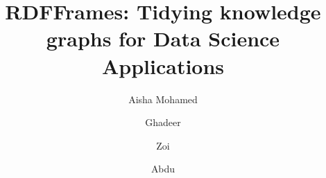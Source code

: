 \documentclass[sigconf, review, anonymous]{acmart}
\begin{document}
	

\title{RDFFrames: Tidying knowledge graphs for Data Science Applications}

\author{Aisha Mohamed}
\email{}
\orcid{}
\author{}
\affiliation{%
  \institution{}
  \streetaddress{}
  \city{}
  \state{}
  \postcode{}
}

\author{Ghadeer}
\email{}
\orcid{}
\author{}
\affiliation{%
  \institution{}
  \streetaddress{}
  \city{}
  \state{}
  \postcode{}
}

\author{Zoi}
\email{}
\orcid{}
\author{}
\affiliation{%
  \institution{}
  \streetaddress{}
  \city{}
  \state{}
  \postcode{}
}

\author{Abdu}
\email{}
\orcid{}
\author{}
\affiliation{%
  \institution{}
  \streetaddress{}
  \city{}
  \state{}
  \postcode{}
}


\renewcommand{\shortauthors}{}

\begin{abstract}
\end{abstract}


\keywords{}

\end{document}
